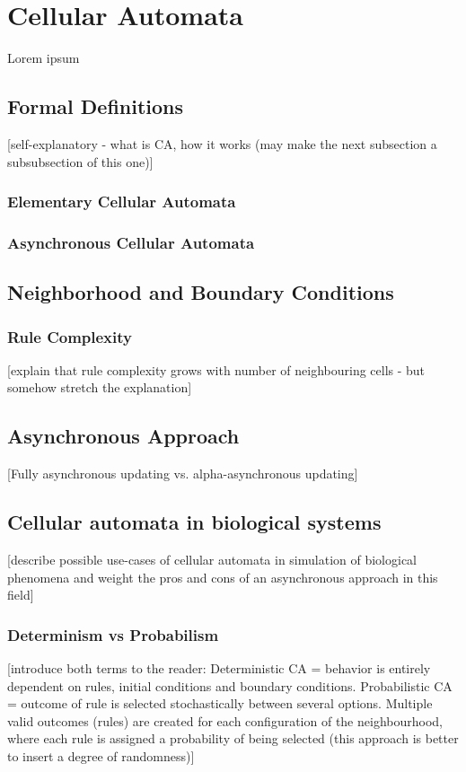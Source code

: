 \documentclass[../projekt.tex]{subfiles}
\begin{document}

\chapter{Cellular Automata}
\label{chap-ca}

Lorem ipsum

\section{Formal Definitions}
[self-explanatory - what is CA, how it works (may make the next subsection a subsubsection of this one)]
\subsection{Elementary Cellular Automata}
\subsection{Asynchronous Cellular Automata}

\section{Neighborhood and Boundary Conditions}
\subsection{Rule Complexity}
[explain that rule complexity grows with number of neighbouring cells - but somehow stretch the explanation]

\section{Asynchronous Approach}
[Fully asynchronous updating vs. alpha-asynchronous updating]

\section{Cellular automata in biological systems}
[describe possible use-cases of cellular automata in simulation of biological phenomena and weight the pros and cons of an 
asynchronous approach in this field]
\subsection{Determinism vs Probabilism}
[introduce both terms to the reader: Deterministic CA = behavior is entirely dependent on rules, initial conditions and boundary 
conditions. Probabilistic CA = outcome of rule is selected stochastically between several options. Multiple valid outcomes (rules) are 
created for each configuration of the neighbourhood, where each rule is assigned a probability of being selected (this approach is 
better to insert a degree of randomness)]

\end{document}
